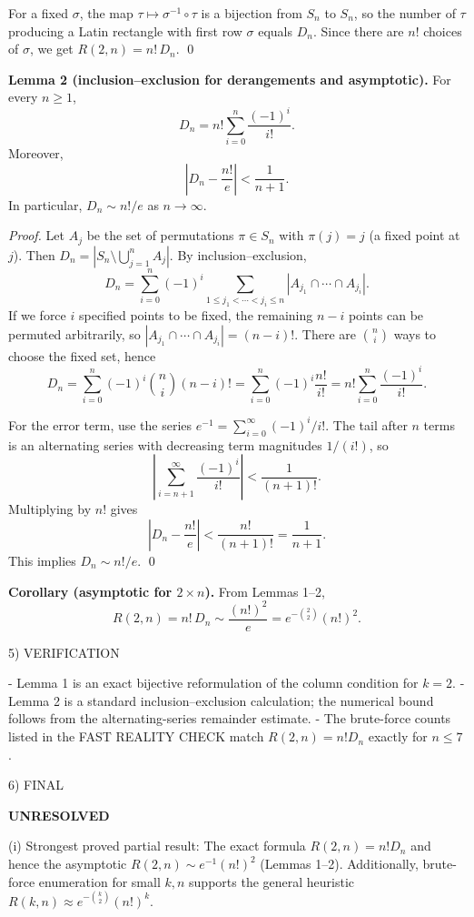 For a fixed $\sigma$, the map $\tau\mapsto \sigma^{-1}\circ\tau$ is a bijection from $S_n$ to $S_n$, so the number of $\tau$ producing a Latin rectangle with first row $\sigma$ equals $D_n$.
Since there are $n!$ choices of $\sigma$, we get $R(2,n)=n!\,D_n$.
\qed

\medskip

\textbf{Lemma 2 (inclusion--exclusion for derangements and asymptotic).}
For every $n\ge 1$,
\[
D_n = n!\sum_{i=0}^n \frac{(-1)^i}{i!}.
\]
Moreover,
\[
\left|D_n - \frac{n!}{e}\right| < \frac{1}{n+1}.
\]
In particular, $D_n\sim n!/e$ as $n\to\infty$.

\emph{Proof.}
Let $A_j$ be the set of permutations $\pi\in S_n$ with $\pi(j)=j$ (a fixed point at $j$).
Then $D_n = |S_n\setminus\bigcup_{j=1}^n A_j|$.
By inclusion--exclusion,
\[
D_n = \sum_{i=0}^n (-1)^i\sum_{1\le j_1<\cdots<j_i\le n} |A_{j_1}\cap\cdots\cap A_{j_i}|.
\]
If we force $i$ specified points to be fixed, the remaining $n-i$ points can be permuted arbitrarily, so
$|A_{j_1}\cap\cdots\cap A_{j_i}|=(n-i)!$.
There are $\binom{n}{i}$ ways to choose the fixed set, hence
\[
D_n = \sum_{i=0}^n (-1)^i\binom{n}{i}(n-i)! = \sum_{i=0}^n (-1)^i\frac{n!}{i!} = n!\sum_{i=0}^n \frac{(-1)^i}{i!}.
\]

For the error term, use the series $e^{-1}=\sum_{i=0}^{\infty}(-1)^i/i!$.
The tail after $n$ terms is an alternating series with decreasing term magnitudes $1/(i!)$, so
\[
\left|\sum_{i=n+1}^{\infty} \frac{(-1)^i}{i!}\right| < \frac{1}{(n+1)!}.
\]
Multiplying by $n!$ gives
\[
\left|D_n - \frac{n!}{e}\right| < \frac{n!}{(n+1)!} = \frac{1}{n+1}.
\]
This implies $D_n\sim n!/e$.
\qed

\medskip

\textbf{Corollary (asymptotic for $2\times n$).}
From Lemmas 1--2,
\[
R(2,n)=n!\,D_n \sim \frac{(n!)^2}{e} = e^{-\binom{2}{2}}(n!)^2.
\]

5) VERIFICATION

- Lemma 1 is an exact bijective reformulation of the column condition for $k=2$.
- Lemma 2 is a standard inclusion--exclusion calculation; the numerical bound follows from the alternating-series remainder estimate.
- The brute-force counts listed in the FAST REALITY CHECK match $R(2,n)=n!D_n$ exactly for $n\le 7$.

6) FINAL

\textbf{UNRESOLVED}

(i) Strongest proved partial result: The exact formula $R(2,n)=n!D_n$ and hence the asymptotic $R(2,n)\sim e^{-1}(n!)^2$ (Lemmas 1--2). Additionally, brute-force enumeration for small $k,n$ supports the general heuristic $R(k,n)\approx e^{-\binom{k}{2}}(n!)^k$.

